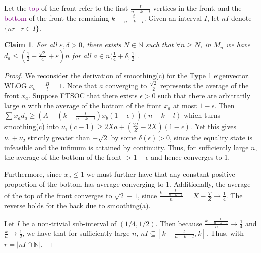 \documentclass[11pt]{article}
\newcommand{\purp}[1]{\textcolor{purple}{#1}}
\newtheorem{clm}[thm]{Claim}
\begin{document}
Let the \purp{top} of the front refer to the first $\frac{t}{n-k-l}$ vertices in the front, and the \purp{bottom} of the front the remaining $k - \frac{t}{n-k-l}$. Given an interval $I$, let $nI$ denote $\{nr \mid r \in I\}$. 

\begin{clm}\label{clm:degree}
    For all $\varepsilon, \delta > 0$, there exists $N \in \mathbb{N}$ such that $\forall n \ge N$, in $M_n$ we have $d_a \le (\frac12 - \frac{\sqrt{2}}{4} + \varepsilon)n$ for all $a \in n(\frac14 + \delta, \frac12]$. 
\end{clm}
\begin{proof}
    We reconsider the derivation of smoothing(c) for the Type 1 eigenvector. WLOG $x_b = \frac{B}{l} = 1$. Note that $a$ converging to $\frac{\sqrt{2}}{2}$ represents the average of the front $x_a$. Suppose FTSOC that there exists $\epsilon > 0$ such that there are arbitrarily large $n$ with the average of the bottom of the front $x_a$ at most $1-\epsilon$. Then $\sum x_ad_a \ge (A - (k - \frac{t}{n-k-l})x_b(1-\epsilon))(n-k-l)$ which turns smoothing(c) into $\nu_1(c-1) \ge 2Xa + (\frac{2T}{Z} - 2X)(1-\epsilon)$. Yet this gives $\nu_1 + \nu_2$ strictly greater than $-\sqrt{2}$ by some $\delta(\epsilon) > 0$, since the equality state is infeasible and the infimum is attained by continuity. Thus, for sufficiently large $n$, the average of the bottom of the front $> 1-\epsilon$ and hence converges to 1. 

    Furthermore, since $x_a \le 1$ we must further have that any constant positive proportion of the bottom has average converging to 1. Additionally, the average of the top of the front converges to $\sqrt{2} - 1$, since $\frac{k - \frac{t}{n-k-l}}{n} = X - \frac{T}{Z} \to \frac14$. The reverse holds for the back due to smoothing(a). 

    Let $I$ be a non-trivial sub-interval of $(1/4, 1/2)$. Then because $\frac{k - \frac{t}{n-k-l}}{n} \to \frac14$ and $\frac{k}{n} \to \frac12$, we have that for sufficiently large $n$, $nI \subseteq [k - \frac{t}{n-k-l}, k]$. Thus, with $r = |nI \cap \mathbb{N}|$,
    

\end{proof}
\end{document}

